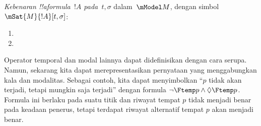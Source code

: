 \documentclass[../../../include/open-logic-section]{subfiles}
\begin{document}
\begin{defn}
  \emph{Kebenaran !!a{formula}~$!A$ pada~$t,\sigma$} dalam~$\mModel M$,
  dengan simbol $\mSat{M}{!A}[t,\sigma]$:
  \begin{enumerate}
  \item{} 
  \item{} 
  \end{enumerate}
\end{defn}

Operator temporal dan modal lainnya dapat didefinisikan dengan cara serupa.
Namun, sekarang kita dapat merepresentasikan pernyataan yang menggabungkan
kala dan modalitas. Sebagai contoh, kita dapat menyimbolkan ``$p$ tidak akan
terjadi, tetapi mungkin saja terjadi'' dengan formula
$\lnot\Ftemp p\land\Diamond\Ftemp p$. Formula ini berlaku pada suatu titik
dan riwayat tempat $p$ tidak menjadi benar pada keadaan penerus, tetapi
terdapat riwayat alternatif tempat $p$ akan menjadi benar.
\end{document}
